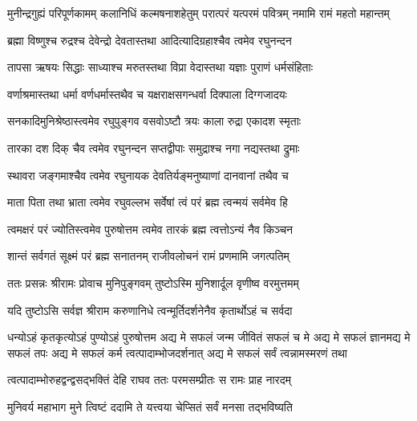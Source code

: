 \fourlineindentedshloka
{मुनीन्द्रगुह्यं परिपूर्णकामम्} 
{कलानिधिं कल्मषनाशहेतुम्}
{परात्परं यत्परमं पवित्रम्}
{नमामि रामं महतो महान्तम्}%

\twolineshloka
{ब्रह्मा विष्णुश्च रुद्रश्च देवेन्द्रो देवतास्तथा}
{आदित्यादिग्रहाश्चैव त्वमेव रघुनन्दन}%

\twolineshloka
{तापसा ऋषयः सिद्धाः साध्याश्च मरुतस्तथा}
{विप्रा वेदास्तथा यज्ञाः पुराणं धर्मसंहिताः}%

\twolineshloka
{वर्णाश्रमास्तथा धर्मा वर्णधर्मास्तथैव च}
{यक्षराक्षसगन्धर्वा दिक्पाला दिग्गजादयः}%

\twolineshloka
{सनकादिमुनिश्रेष्ठास्त्वमेव रघुपुङ्गव}
{वसवोऽष्टौ त्रयः काला रुद्रा एकादश स्मृताः}%

\twolineshloka
{तारका दश दिक् चैव त्वमेव रघुनन्दन}
{सप्तद्वीपाः समुद्राश्च नगा नद्यस्तथा द्रुमाः}%

\twolineshloka
{स्थावरा जङ्गमाश्चैव त्वमेव रघुनायक}
{देवतिर्यङ्मनुष्याणां दानवानां तथैव च}%

\twolineshloka
{माता पिता तथा भ्राता त्वमेव रघुवल्लभ}
{सर्वेषां त्वं परं ब्रह्म त्वन्मयं सर्वमेव हि}%

\twolineshloka
{त्वमक्षरं परं ज्योतिस्त्वमेव पुरुषोत्तम}
{त्वमेव तारकं ब्रह्म त्वत्तोऽन्यं नैव किञ्चन}%

\twolineshloka
{शान्तं सर्वगतं सूक्ष्मं परं ब्रह्म सनातनम्}
{राजीवलोचनं रामं प्रणमामि जगत्पतिम्}%


\twolineshloka
{ततः प्रसन्नः श्रीरामः प्रोवाच मुनिपुङ्गवम्}
{तुष्टोऽस्मि मुनिशार्दूल वृणीष्व वरमुत्तमम्}%


\twolineshloka
{यदि तुष्टोऽसि सर्वज्ञ श्रीराम करुणानिधे}
{त्वन्मूर्तिदर्शनेनैव कृतार्थोऽहं च सर्वदा}%

\threelineshloka
{धन्योऽहं कृतकृत्योऽहं पुण्योऽहं पुरुषोत्तम}
{अद्य मे सफलं जन्म जीवितं सफलं च मे}%
{अद्य मे सफलं ज्ञानमद्य मे सफलं तपः}
\twolineshloka
{अद्य मे सफलं कर्म त्वत्पादाम्भोजदर्शनात्}
{अद्य मे सफलं सर्वं त्वन्नामस्मरणं तथा}%

\twolineshloka
{त्वत्पादाम्भोरुहद्वन्द्वसद्भक्तिं देहि राघव}
{ततः परमसम्प्रीतः स रामः प्राह नारदम्}%


\twolineshloka
{मुनिवर्य महाभाग मुने त्विष्टं ददामि ते}
{यत्त्वया चेप्सितं सर्वं मनसा तद्भविष्यति}%


